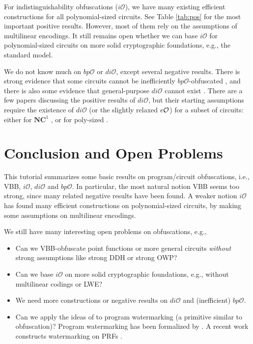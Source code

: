 \documentclass[12pt]{article}
\newcommand{\io}{i\mathcal{O}}
\newcommand{\dio}{di\mathcal{O}}
\newcommand{\bpo}{bp\mathcal{O}}
\theoremstyle{definition}
\begin{document}
For indistinguishability obfuscations ($\io$), we have many existing efficient constructions for all polynomial-sized circuits. See Table \ref{tab:pos} for the most important positive results. However, most of them rely on the assumptions of multilinear encodings. It still remains open whether we can base $\io$ for polynomial-sized circuits on more solid cryptographic foundations, e.g., the standard model.

We do not know much on $\bpo$ or $\dio$, except several negative results. There is strong evidence that some circuits cannot be inefficiently $\bpo$-obfuscated \cite{goldwasser2007best}, and there is also some evidence that general-purpose $\dio$ cannot exist \cite{garg2014implausibility}. There are a few papers \cite{boyle2014extractability,ananth2013differing} discussing the positive results of $\dio$, but their starting assumptions require the existence of $\dio$ (or the slightly relaxed $e\mathcal{O}$) for a subset of circuits: either for $\mathbf{NC}^1$ \cite{boyle2014extractability}, or for poly-sized \cite{ananth2013differing}.

\section{Conclusion and Open Problems}
This tutorial summarizes some basic results on program/circuit obfuscations, i.e., VBB, $\io$, $\dio$ and $\bpo$. In particular, the most natural notion VBB seems too strong, since many related negative results have been found. A weaker notion $\io$ has found many efficient constructions on polynomial-sized circuits, by making some assumptions on multilinear encodings. 

We still have many interesting open problems on obfuscations, e.g.,
\begin{itemize}
\item Can we VBB-obfuscate point functions or more general circuits \emph{without} strong assumptions like strong DDH or strong OWP?
\item Can we base $\io$ on more solid cryptographic foundations, e.g., without multilinear codings or LWE?
\item We need more constructions or negative results on $\dio$ and (inefficient) $\bpo$.
\item Can we apply the ideas of \cite{garg2013candidate} to program watermarking (a primitive similar to obfuscation)? Program watermarking has been formalized by \cite{barak2012possibility}. A recent work constructs watermarking on PRFs \cite{CHN16}.
\end{itemize}



	
\end{document}
